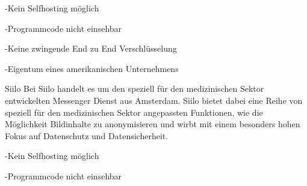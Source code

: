 -Kein Selfhosting möglich 

-Programmcode nicht einsehbar

-Keine zwingende End zu End Verschlüsselung

-Eigentum eines amerikanischen Unternehmens

Siilo 
Bei Siilo handelt es um den speziell für den medizinischen Sektor entwickelten Messenger Dienst aus Amsterdam.
Siilo bietet dabei eine Reihe von speziell für den medizinischen Sektor angepassten Funktionen, wie die Möglichkeit Bildinhalte zu anonymisieren und wirbt mit einem besonders hohen Fokus auf Datenschutz und Datensicherheit.

-Kein Selfhosting möglich

-Programmcode nicht einsehbar
